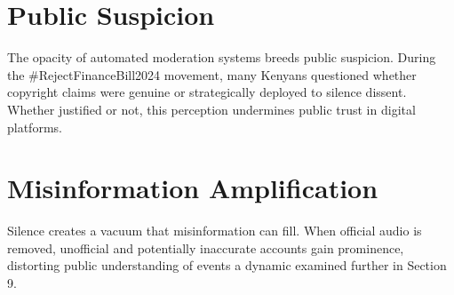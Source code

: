 \documentclass{article}
\begin{document}
\section{Public Suspicion}
\par 
The opacity of automated moderation systems breeds public suspicion. During the \#RejectFinanceBill2024 movement, many Kenyans questioned whether copyright claims were genuine or strategically deployed to silence dissent. Whether justified or not, this perception undermines public trust in digital platforms.

\section{Misinformation Amplification}
\par 
Silence creates a vacuum that misinformation can fill. When official audio is removed, unofficial and potentially inaccurate accounts gain prominence, distorting public understanding of events a dynamic examined further in Section 9.
\end{document}

